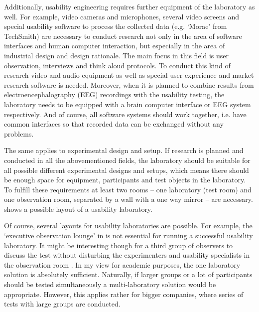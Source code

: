 \documentclass[output=paper]{langsci/langscibook}
\begin{document}
Additionally, usability engineering requires further equipment of the laboratory as well. For example, video cameras and microphones, several video screens and special usability software to process the collected data (e.g. `Morae' from TechSmith) are necessary to conduct research not only in the area of software interfaces and human computer interaction, but especially in the area of industrial design and design rationale. The main focus in this field is user observation, interviews and think aloud protocols. To conduct this kind of research video and audio equipment as well as special user experience and market research software is needed. Moreover, when it is planned to combine results from electroencephalography (EEG) recordings with the usability testing, the laboratory needs to be equipped with a brain computer interface or EEG system respectively. And of course, all software systems should work together, i.e. have common interfaces so that recorded data can be exchanged without any problems.



The same applies to experimental design and setup. If research is planned and conducted in all the abovementioned fields, the laboratory should be suitable for all possible different experimental designs and setups, which means there should be enough space for equipment, participants and test objects in the laboratory. To fulfill these requirements at least two rooms -- one laboratory (test room) and one observation room, separated by a wall with a one way mirror -- are necessary.  shows a possible layout of a usability laboratory.



Of course, several layouts for usability laboratories are possible. For example, the `executive observation lounge' in  is not essential for running a successful usability laboratory. It might be interesting though for a third group of observers to discuss the test without disturbing the experimenters and usability specialists in the observation room \citep[cf.][203ff.]{nielsen1993}. In my view for academic purposes, the one laboratory solution is absolutely sufficient. Naturally, if larger groups or a lot of participants should be tested simultaneously a multi-laboratory solution would be appropriate. However, this applies rather for bigger companies, where series of tests with large groups are conducted.
\end{document}
